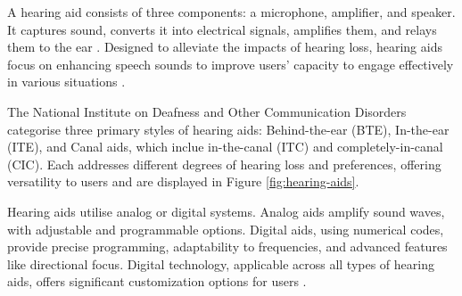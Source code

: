 \documentclass{l4proj}
\begin{document}
A hearing aid consists of three components: a microphone, amplifier, and speaker. It captures sound, converts it into electrical signals, amplifies them, and relays them to the ear \citep{Disorders_2022}. Designed to alleviate the impacts of hearing loss, hearing aids focus on enhancing speech sounds to improve users' capacity to engage effectively in various situations \citep{ferguson2017hearing}.

The National Institute on Deafness and Other Communication Disorders categorise three primary styles of hearing aids: Behind-the-ear (BTE), In-the-ear (ITE), and Canal aids, which inclue in-the-canal (ITC) and completely-in-canal (CIC). Each addresses different degrees of hearing loss and preferences, offering versatility to users and are displayed in Figure \ref{fig:hearing-aids}. 

Hearing aids utilise analog or digital systems. Analog aids amplify sound waves, with adjustable and programmable options. Digital aids, using numerical codes, provide precise programming, adaptability to frequencies, and advanced features like directional focus. Digital technology, applicable across all types of hearing aids, offers significant customization options for users \citep{Disorders_2022}.
\end{document}
